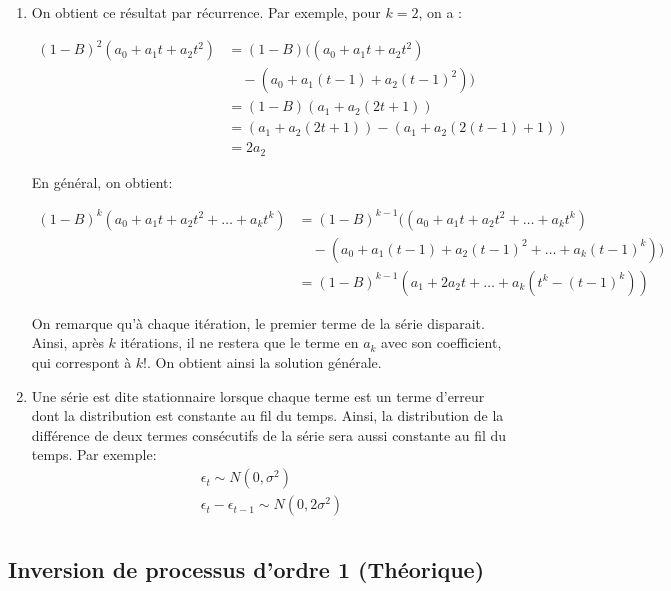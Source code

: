 \documentclass{article}
\begin{document}
\begin{enumerate}

\item On obtient ce résultat par récurrence. Par exemple, pour $k=2$, on a :

\begin{align*}
(1-B)^2 (a_0+a_1t+a_2t^2) &= (1-B) ((a_0+a_1t+a_2t^2)\\ &\quad- (a_0+a_1(t-1)+a_2(t-1)^2)) \\
&= (1-B) (a_1+a_2(2t+1)) \\
&= (a_1+a_2(2t+1)) - (a_1+a_2(2(t-1)+1)) \\
&= 2a_2
\end{align*}

En général, on obtient:

\begin{align*}
(1-B)^k (a_0+a_1t+a_2t^2+\ldots+a_kt^k) &= (1-B)^{k-1} ((a_0+a_1t+a_2t^2+\ldots+a_kt^k)\\ &\quad- (a_0+a_1(t-1)+a_2(t-1)^2+\ldots+a_k(t-1)^k)) \\
&= (1-B)^{k-1} (a_1 + 2a_2t+\ldots+a_k(t^k-(t-1)^k))
\end{align*}

On remarque qu'à chaque itération, le premier terme de la série disparait. Ainsi, après $k$ itérations, il ne restera que le terme en $a_k$ avec son coefficient, qui correspont à $k!$. On obtient ainsi la solution générale.

\item Une série est dite stationnaire lorsque chaque terme est un terme d'erreur dont la distribution est constante au fil du temps. Ainsi, la distribution de la différence de deux termes consécutifs de la série sera aussi constante au fil du temps. Par exemple:
\begin{align*}
\epsilon_t \sim N(0,\sigma^2)  \\
\epsilon_t - \epsilon_{t-1} \sim N(0,2\sigma^2) \\
\end{align*}

\end{enumerate}



\clearpage
\subsection{Inversion de processus d'ordre 1 (Théorique)}
\end{document}
